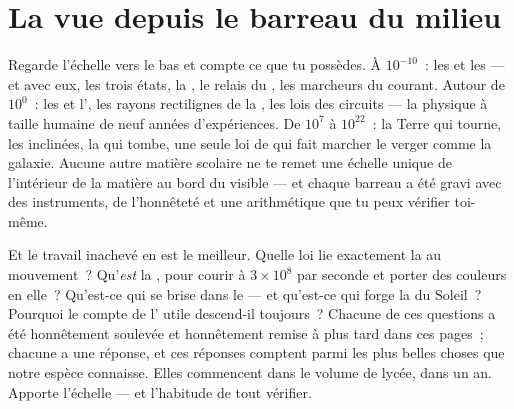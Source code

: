 \section{La vue depuis le barreau du milieu}

\begin{remark}\label{rem:g9:atoms-to-galaxies:built}
Regarde l'échelle vers le bas et compte ce que tu possèdes. À
$10^{-10}$~: les  et les  --- et avec eux, les trois
états, la , le relais du , les marcheurs du courant. Autour
de $10^{0}$~: les  et l', les rayons rectilignes de la
, les lois des circuits --- la physique à taille humaine de
neuf années d'expériences. De $10^{7}$ à $10^{22}$~: la Terre qui
tourne, les  inclinées, la  qui tombe, une seule loi de
 qui fait marcher le verger comme la galaxie. Aucune autre
matière scolaire ne te remet une échelle unique de l'intérieur de la
matière au bord du visible --- et chaque barreau a été gravi avec des
instruments, de l'honnêteté et une arithmétique que tu peux vérifier
toi-même.
\end{remark}

\begin{remark}\label{rem:g9:atoms-to-galaxies:ahead}
Et le travail inachevé en est le meilleur. Quelle loi lie exactement
la  au mouvement~? Qu'\emph{est} la , pour courir à
$3 \times 10^{8}$  par seconde et porter des couleurs en
elle~? Qu'est-ce qui se brise dans le  --- et qu'est-ce qui
forge la  du Soleil~? Pourquoi le compte de l' utile
descend-il toujours~? Chacune de ces questions a été honnêtement
soulevée et honnêtement remise à plus tard dans ces pages~; chacune a
une réponse, et ces réponses comptent parmi les plus belles choses que
notre espèce connaisse. Elles commencent dans le volume de lycée, dans
un an. Apporte l'échelle --- et l'habitude de tout vérifier.
\end{remark}

